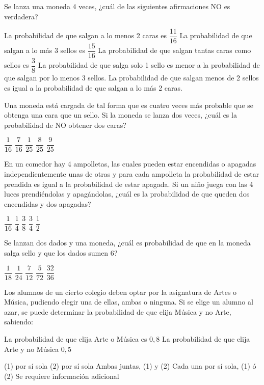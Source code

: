 \documentclass[sin nombre]{srs2}
\begin{document}
\begin{preguntas}
\pregunta Se lanza una moneda 4 veces, ¿cuál de las siguientes afirmaciones NO es verdadera?
\begin{alternativas}
\alternativa La probabilidad de que salgan a lo menos 2 caras es $\dfrac{11}{16}$
\alternativa La probabilidad de que salgan a lo más 3 sellos es $\dfrac{15}{16}$
\alternativa La probabilidad de que salgan tantas caras como sellos es $\dfrac{3}{8}$
\alternativa La probabilidad de que salga solo 1 sello es menor a la probabilidad de que salgan por lo menos 3 sellos.
\alternativa La probabilidad de que salgan menos de 2 sellos es igual a la probabilidad de que salgan a lo más 2 caras.
\end{alternativas}

\pregunta Una moneda está cargada de tal forma que es cuatro veces más probable que se obtenga una cara que un sello. Si la moneda se lanza dos veces, ¿cuál es la probabilidad de NO obtener dos caras?
\begin{alternativas}
\alternativa $\dfrac{1}{16}$
\alternativa $\dfrac{7}{16}$
\alternativa $\dfrac{1}{25}$
\alternativa $\dfrac{8}{25}$
\alternativa $\dfrac{9}{25}$
\end{alternativas}

\pregunta En un comedor hay 4 ampolletas, las cuales pueden estar encendidas o apagadas independientemente unas de otras y para cada ampolleta la probabilidad de estar prendida es igual a la probabilidad de estar apagada. Si un niño juega con las 4 luces prendiéndolas y apagándolas, ¿cuál es la probabilidad de que queden dos encendidas y dos apagadas?
\begin{alternativas}
\alternativa $\dfrac{1}{16}$
\alternativa $\dfrac{1}{4}$
\alternativa $\dfrac{3}{8}$
\alternativa $\dfrac{3}{4}$
\alternativa $\dfrac{1}{2}$
\end{alternativas}

\pregunta Se lanzan dos dados y una moneda, ¿cuál es probabilidad de que en la moneda salga sello y que los dados sumen 6?
\begin{alternativas}
\alternativa $\dfrac{1}{18}$
\alternativa $\dfrac{1}{24}$
\alternativa $\dfrac{7}{12}$
\alternativa $\dfrac{5}{72}$
\alternativa $\dfrac{32}{36}$ %
\end{alternativas}

\pregunta Los alumnos de un cierto colegio deben optar por la asignatura de Artes o Música, pudiendo elegir una de ellas, ambas o ninguna. Si se elige un alumno al azar, se puede determinar la probabilidad de que elija Música y no Arte, sabiendo:
\begin{opciones*}
\opcion La probabilidad de que elija Arte o Música es $0,8$
\opcion La probabilidad de que elija Arte y no Música $0,5$
\end{opciones*}
\begin{alternativas}
\alternativa (1) por sí sola
\alternativa (2) por sí sola
\alternativa Ambas juntas, (1) y (2)
\alternativa Cada una por sí sola, (1) ó (2)
\alternativa Se requiere información adicional
\end{alternativas}


\end{preguntas}
\end{document}
